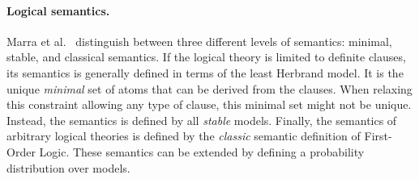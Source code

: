 \paragraph{Logical semantics.} 
Marra et al.~\cite{marra2024statistical} distinguish between three different levels of semantics: minimal, stable, and classical semantics. If the logical theory is limited to definite clauses, its semantics is generally defined in terms of the least Herbrand model. It is the unique \textit{minimal} set of atoms that can be derived from the clauses.
When relaxing this constraint allowing any type of clause, this minimal set might not be unique. Instead, the semantics is defined by all \textit{stable} models. Finally, the semantics of arbitrary logical theories is defined by the \textit{classic} semantic definition of First-Order Logic.
These semantics can be extended by defining a probability distribution over models.


